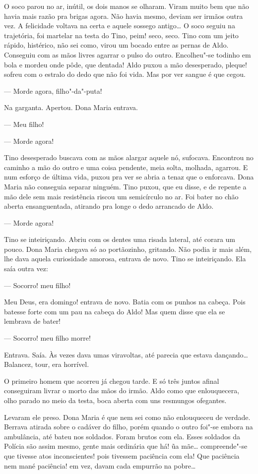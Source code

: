 O soco parou no ar, inútil, os dois manos se olharam. Viram muito bem
que não havia mais razão pra brigas agora. Não havia mesmo, deviam ser
irmãos outra vez. A felicidade voltava na certa e aquele sossego
antigo\ldots{} O soco seguiu na trajetória, foi martelar na testa do Tino,
peim! seco, seco. Tino com um jeito rápido, histérico, não sei como,
virou um bocado entre as pernas de Aldo. Conseguiu com as mãos livres
agarrar o pulso do outro. Encolheu"-se todinho em bola e mordeu onde
pôde, que dentada! Aldo puxou a mão desesperado, pleque! sofreu com o
estralo do dedo que não foi vida. Mas por ver sangue é que cegou.

--- Morde agora, filho"-da"-puta!

Na garganta. Apertou. Dona Maria entrava. 

--- Meu filho!

--- Morde agora!

Tino desesperado buscava com as mãos alargar aquele nó, sufocava.
Encontrou no caminho a mão do outro e uma coisa pendente, meia solta,
molhada, agarrou. E num esforço de última vida, puxou pra ver se abria a
tenaz que o enforcava. Dona Maria não conseguia separar ninguém. Tino
puxou, que eu disse, e de repente a mão dele sem mais resistência riscou
um semicírculo no ar. Foi bater no chão aberta ensanguentada, atirando
pra longe o dedo arrancado de Aldo.

--- Morde agora!

Tino se inteiriçando. Abriu com os dentes uma risada lateral, até corara
um pouco. Dona Maria chegava só ao portãozinho, gritando. Não podia ir
mais além, lhe dava aquela curiosidade amorosa, entrava de novo. Tino se
inteiriçando. Ela saía outra vez:

--- Socorro! meu filho!

Meu Deus, era domingo! entrava de novo. Batia com os punhos na cabeça.
Pois batesse forte com um pau na cabeça do Aldo! Mas quem disse que ela
se lembrava de bater!

--- Socorro! meu filho morre!

Entrava. Saía. Às vezes dava umas viravoltas, até parecia que estava
dançando\ldots{} Balancez, tour, era horrível.

O primeiro homem que acorreu já chegou tarde. E só três juntos afinal
conseguiram livrar o morto das mãos do irmão. Aldo como que
enlouquecera, olho parado no meio da testa, boca aberta com uns
resmungos ofegantes.

Levaram ele preso. Dona Maria é que nem sei como não enlouqueceu de
verdade. Berrava atirada sobre o cadáver do filho, porém quando o outro
foi"-se embora na ambulância, até bateu nos soldados. Foram brutos com
ela. Esses soldados da Polícia são assim mesmo, gente mais ordinária que
há! ũa mãe\ldots{} compreende"-se que tivesse atos inconscientes! pois
tivessem paciência com ela! Que paciência nem mané paciência! em vez,
davam cada empurrão na pobre\ldots{}

